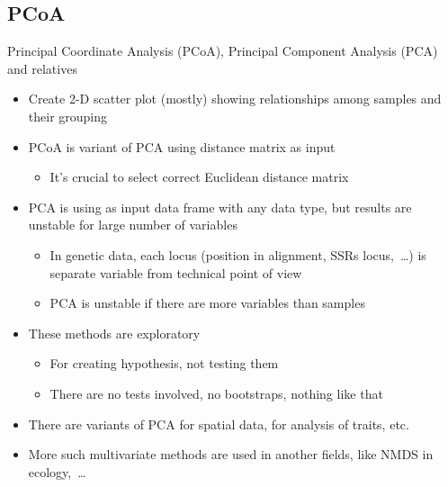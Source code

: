 \documentclass[compress, xelatex, 11pt, xcolor=svgnames, aspectratio=169,
	hyperref={
		bookmarks=true,
		unicode=true,
		colorlinks=true,
		pdftitle={Molecular data in R},
		plainpages=false,
		pdfauthor={Vojtech Zeisek},
		pdfsubject={Course about phylogeny and evolution in R},
		pdfcreator={XeLaTeX},
		pdfkeywords={R, evolution, phylogeny, molecular data},
		linkcolor=Crimson, %
		anchorcolor=Magenta, %
		citecolor=Magenta, %
		filecolor=Magenta, %
		menucolor=Magenta, %
		urlcolor=DodgerBlue, %
		},
	url={hyphens, lowtilde} %
	]{beamer}
\begin{document}
\subsection{PCoA}

\begin{frame}{Principal Coordinate Analysis (PCoA), Principal Component Analysis (PCA) and relatives}
	\label{pcoa}
	\begin{itemize}
		\item Create 2-D scatter plot (mostly) showing relationships among samples and their grouping
		\item PCoA is variant of PCA using distance matrix as input
		\begin{itemize}
			\item It's crucial to select correct Euclidean distance matrix
		\end{itemize}
		\item PCA is using as input data frame with any data type, but results are unstable for large number of variables
		\begin{itemize}
			\item In genetic data, each locus (position in alignment, SSRs locus,~\ldots) is separate variable from technical point of view
			\item PCA is unstable if there are more variables than samples
		\end{itemize}
		\item These methods are exploratory
		\begin{itemize}
		 \item For creating hypothesis, not testing them
		 \item There are no tests involved, no bootstraps, nothing like that
		\end{itemize}
		\item There are variants of PCA for spatial data, for analysis of traits, etc.
		\item More such multivariate methods are used in another fields, like NMDS in ecology,~\ldots
	\end{itemize}
\end{frame}
\end{document}
